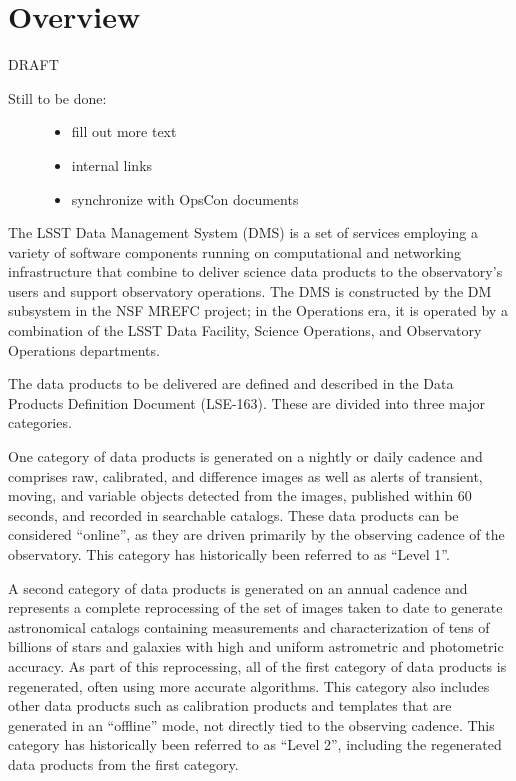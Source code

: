 \documentclass[]{article}
\date{}
\providecommand{\tightlist}{%
  \setlength{\itemsep}{0pt}\setlength{\parskip}{0pt}}
\begin{document}
\section{Overview}\label{overview}

DRAFT

\begin{description}
\item[Still to be done:]
\begin{itemize}
\tightlist
\item
  fill out more text
\item
  internal links
\item
  synchronize with OpsCon documents
\end{itemize}
\end{description}

The LSST Data Management System (DMS) is a set of services employing a
variety of software components running on computational and networking
infrastructure that combine to deliver science data products to the
observatory's users and support observatory operations. The DMS is
constructed by the DM subsystem in the NSF MREFC project; in the
Operations era, it is operated by a combination of the LSST Data
Facility, Science Operations, and Observatory Operations departments.

The data products to be delivered are defined and described in the Data
Products Definition Document (LSE-163). These are divided into three
major categories.

One category of data products is generated on a nightly or daily cadence
and comprises raw, calibrated, and difference images as well as alerts
of transient, moving, and variable objects detected from the images,
published within 60 seconds, and recorded in searchable catalogs. These
data products can be considered ``online'', as they are driven primarily
by the observing cadence of the observatory. This category has
historically been referred to as ``Level 1''.

A second category of data products is generated on an annual cadence and
represents a complete reprocessing of the set of images taken to date to
generate astronomical catalogs containing measurements and
characterization of tens of billions of stars and galaxies with high and
uniform astrometric and photometric accuracy. As part of this
reprocessing, all of the first category of data products is regenerated,
often using more accurate algorithms. This category also includes other
data products such as calibration products and templates that are
generated in an ``offline'' mode, not directly tied to the observing
cadence. This category has historically been referred to as ``Level 2'',
including the regenerated data products from the first category.
\end{document}
